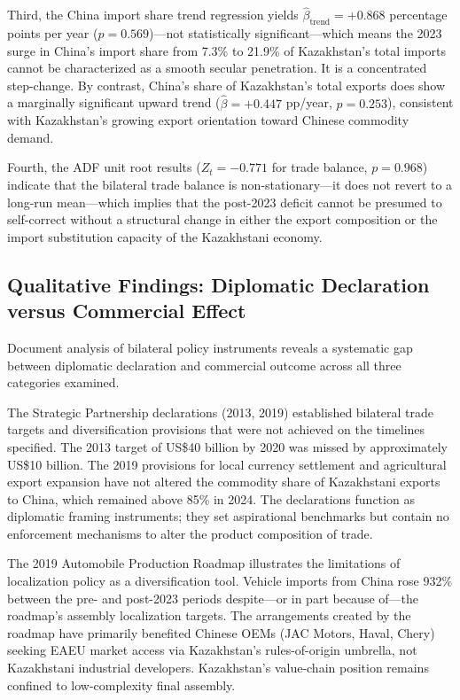 \documentclass[12pt]{article}
\begin{document}
Third, the China import share trend regression yields $\hat{\beta}_{\text{trend}} = +0.868$ percentage points per year ($p = 0.569$)---not statistically significant---which means the 2023 surge in China's import share from 7.3\% to 21.9\% of Kazakhstan's total imports cannot be characterized as a smooth secular penetration. It is a concentrated step-change. By contrast, China's share of Kazakhstan's total exports does show a marginally significant upward trend ($\hat{\beta} = +0.447$ pp/year, $p = 0.253$), consistent with Kazakhstan's growing export orientation toward Chinese commodity demand.

Fourth, the ADF unit root results ($Z_t = -0.771$ for trade balance, $p = 0.968$) indicate that the bilateral trade balance is non-stationary---it does not revert to a long-run mean---which implies that the post-2023 deficit cannot be presumed to self-correct without a structural change in either the export composition or the import substitution capacity of the Kazakhstani economy.

\subsection{Qualitative Findings: Diplomatic Declaration versus Commercial Effect}

Document analysis of bilateral policy instruments reveals a systematic gap between diplomatic declaration and commercial outcome across all three categories examined.

The Strategic Partnership declarations (2013, 2019) established bilateral trade targets and diversification provisions that were not achieved on the timelines specified. The 2013 target of US\$40 billion by 2020 was missed by approximately US\$10 billion. The 2019 provisions for local currency settlement and agricultural export expansion have not altered the commodity share of Kazakhstani exports to China, which remained above 85\% in 2024. The declarations function as diplomatic framing instruments; they set aspirational benchmarks but contain no enforcement mechanisms to alter the product composition of trade.

The 2019 Automobile Production Roadmap illustrates the limitations of localization policy as a diversification tool. Vehicle imports from China rose 932\% between the pre- and post-2023 periods despite---or in part because of---the roadmap's assembly localization targets. The arrangements created by the roadmap have primarily benefited Chinese OEMs (JAC Motors, Haval, Chery) seeking EAEU market access via Kazakhstan's rules-of-origin umbrella, not Kazakhstani industrial developers. Kazakhstan's value-chain position remains confined to low-complexity final assembly.
\end{document}
